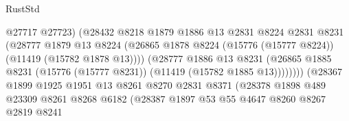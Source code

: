 \begin{lexlean}{RustStd}
\begin{coremodule}
                                          @27717
                                          @27723)
                                        (@28432
                                          @8218
                                          @1879
                                          @1886
                                          @13
                                          @2831
                                          @8224
                                          @2831
                                          @8231
                                          (@28777
                                            @1879
                                            @13
                                            @8224
                                            (@26865
                                              @1878
                                              @8224
                                              (@15776 (@15777 @8224))
                                              (@11419 (@15782 @1878 @13))))
                                          (@28777
                                            @1886
                                            @13
                                            @8231
                                            (@26865
                                              @1885
                                              @8231
                                              (@15776 (@15777 @8231))
                                              (@11419 (@15782 @1885 @13))))))))
                                  (@28367
                                    @1899
                                    @1925
                                    @1951
                                    @13
                                    @8261
                                    @8270
                                    @2831
                                    @8371
                                    (@28378
                                      @1898
                                      @489
                                      @23309
                                      @8261
                                      @8268
                                      @6182
                                      (@28387
                                        @1897
                                        @53
                                        @55
                                        @4647
                                        @8260
                                        @8267
                                        @2819
                                        @8241

\end{coremodule}
\end{lexlean}
